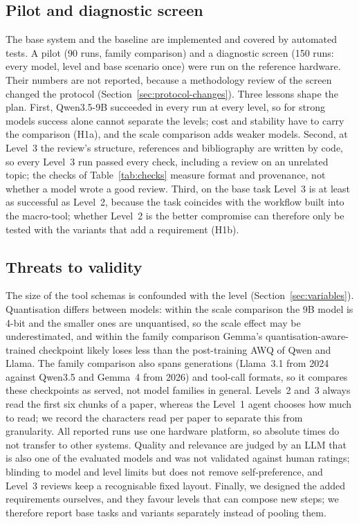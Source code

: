 \subsection{Pilot and diagnostic screen}
\label{sec:pilot}

The base system and the baseline are implemented and covered by automated tests. A pilot (90 runs, family comparison) and a diagnostic screen (150 runs: every model, level and base scenario once) were run on the reference hardware. Their numbers are not reported, because a methodology review of the screen changed the protocol (Section~\ref{sec:protocol-changes}). Three lessons shape the plan. First, Qwen3.5-9B succeeded in every run at every level, so for strong models success alone cannot separate the levels; cost and stability have to carry the comparison (H1a), and the scale comparison adds weaker models. Second, at Level~3 the review's structure, references and bibliography are written by code, so every Level~3 run passed every check, including a review on an unrelated topic; the checks of Table~\ref{tab:checks} measure format and provenance, not whether a model wrote a good review. Third, on the base task Level~3 is at least as successful as Level~2, because the task coincides with the workflow built into the macro-tool; whether Level~2 is the better compromise can therefore only be tested with the variants that add a requirement (H1b).

\subsection{Threats to validity}
\label{sec:threats}

The size of the tool schemas is confounded with the level (Section~\ref{sec:variables}). Quantisation differs between models: within the scale comparison the 9B model is 4-bit and the smaller ones are unquantised, so the scale effect may be underestimated, and within the family comparison Gemma's quantisation-aware-trained checkpoint likely loses less than the post-training AWQ of Qwen and Llama. The family comparison also spans generations (Llama~3.1 from 2024 against Qwen3.5 and Gemma~4 from 2026) and tool-call formats, so it compares these checkpoints as served, not model families in general. Levels~2 and~3 always read the first six chunks of a paper, whereas the Level~1 agent chooses how much to read; we record the characters read per paper to separate this from granularity. All reported runs use one hardware platform, so absolute times do not transfer to other systems. Quality and relevance are judged by an LLM that is also one of the evaluated models and was not validated against human ratings; blinding to model and level limits but does not remove self-preference, and Level~3 reviews keep a recognisable fixed layout. Finally, we designed the added requirements ourselves, and they favour levels that can compose new steps; we therefore report base tasks and variants separately instead of pooling them.
